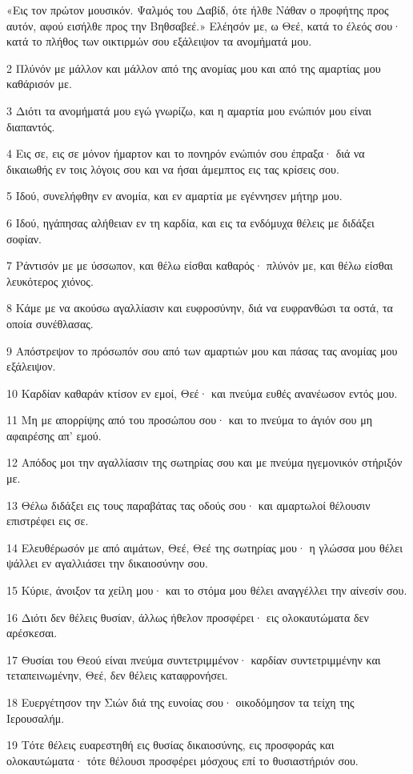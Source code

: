 \par «Εις τον πρώτον μουσικόν. Ψαλμός του Δαβίδ, ότε ήλθε Νάθαν ο προφήτης προς αυτόν, αφού εισήλθε προς την Βηθσαβεέ.» Ελέησόν με, ω Θεέ, κατά το έλεός σου· κατά το πλήθος των οικτιρμών σου εξάλειψον τα ανομήματά μου.
\par 2 Πλύνόν με μάλλον και μάλλον από της ανομίας μου και από της αμαρτίας μου καθάρισόν με.
\par 3 Διότι τα ανομήματά μου εγώ γνωρίζω, και η αμαρτία μου ενώπιόν μου είναι διαπαντός.
\par 4 Εις σε, εις σε μόνον ήμαρτον και το πονηρόν ενώπιόν σου έπραξα· διά να δικαιωθής εν τοις λόγοις σου και να ήσαι άμεμπτος εις τας κρίσεις σου.
\par 5 Ιδού, συνελήφθην εν ανομία, και εν αμαρτία με εγέννησεν μήτηρ μου.
\par 6 Ιδού, ηγάπησας αλήθειαν εν τη καρδία, και εις τα ενδόμυχα θέλεις με διδάξει σοφίαν.
\par 7 Ράντισόν με με ύσσωπον, και θέλω είσθαι καθαρός· πλύνόν με, και θέλω είσθαι λευκότερος χιόνος.
\par 8 Κάμε με να ακούσω αγαλλίασιν και ευφροσύνην, διά να ευφρανθώσι τα οστά, τα οποία συνέθλασας.
\par 9 Απόστρεψον το πρόσωπόν σου από των αμαρτιών μου και πάσας τας ανομίας μου εξάλειψον.
\par 10 Καρδίαν καθαράν κτίσον εν εμοί, Θεέ· και πνεύμα ευθές ανανέωσον εντός μου.
\par 11 Μη με απορρίψης από του προσώπου σου· και το πνεύμα το άγιόν σου μη αφαιρέσης απ' εμού.
\par 12 Απόδος μοι την αγαλλίασιν της σωτηρίας σου και με πνεύμα ηγεμονικόν στήριξόν με.
\par 13 Θέλω διδάξει εις τους παραβάτας τας οδούς σου· και αμαρτωλοί θέλουσιν επιστρέφει εις σε.
\par 14 Ελευθέρωσόν με από αιμάτων, Θεέ, Θεέ της σωτηρίας μου· η γλώσσα μου θέλει ψάλλει εν αγαλλιάσει την δικαιοσύνην σου.
\par 15 Κύριε, άνοιξον τα χείλη μου· και το στόμα μου θέλει αναγγέλλει την αίνεσίν σου.
\par 16 Διότι δεν θέλεις θυσίαν, άλλως ήθελον προσφέρει· εις ολοκαυτώματα δεν αρέσκεσαι.
\par 17 Θυσίαι του Θεού είναι πνεύμα συντετριμμένον· καρδίαν συντετριμμένην και τεταπεινωμένην, Θεέ, δεν θέλεις καταφρονήσει.
\par 18 Ευεργέτησον την Σιών διά της ευνοίας σου· οικοδόμησον τα τείχη της Ιερουσαλήμ.
\par 19 Τότε θέλεις ευαρεστηθή εις θυσίας δικαιοσύνης, εις προσφοράς και ολοκαυτώματα· τότε θέλουσι προσφέρει μόσχους επί το θυσιαστήριόν σου.

